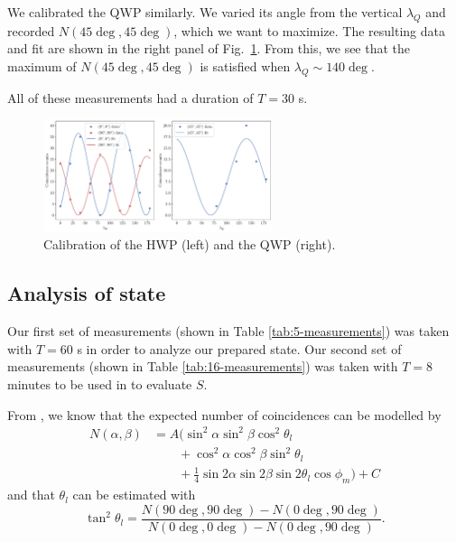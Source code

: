 \documentclass{../paper}
\newcommand{\fig}[1]{Fig.~\ref{#1}}
\begin{document}
We calibrated the QWP similarly. We varied its angle from the vertical $\lambda_Q$ and recorded $N(45\deg,45\deg)$, which we want to maximize. The resulting data and fit are shown in the right panel of \fig{fig:wave-plates}. From this, we see that the maximum of $N(45\deg,45\deg)$ is satisfied when $\lambda_Q \sim 140\deg$.

All of these measurements had a duration of $T = 30$ s.

\begin{figure}
  \centering
  \includegraphics[width=0.6\textwidth]{analysis/wave-plates.pdf}
  \caption{Calibration of the HWP (left) and the QWP (right).}
  \label{fig:wave-plates}
\end{figure}

\subsection{Analysis of state}

Our first set of measurements (shown in Table \ref{tab:5-measurements}) was taken with $T=60$ s in order to analyze our prepared state. Our second set of measurements (shown in Table \ref{tab:16-measurements}) was taken with $T=8$ minutes to be used in to evaluate $S$.

From \cite{LabManual}, we know that the expected number of coincidences can be modelled by
\begin{equation}\label{eq:N-model}
  \begin{aligned}
    N(\alpha,\beta)
    &= A (\sin^2\alpha \sin^2\beta \cos^2\theta_l \\
    &\qquad + \cos^2\alpha \cos^2\beta \sin^2\theta_l \\
    &\qquad + \frac{1}{4} \sin2\alpha \sin2\beta \sin2\theta_l \cos\phi_m) + C
  \end{aligned}
\end{equation}
and that $\theta_l$ can be estimated with
\begin{equation}\label{eq:theta_l}
  \tan^2\theta_l = \frac{N(90\deg,90\deg) - N(0\deg,90\deg)}{N(0\deg,0\deg) - N(0\deg,90\deg)}.
\end{equation}
\end{document}
